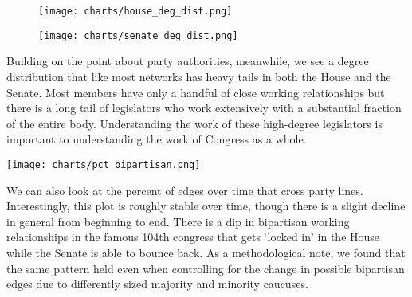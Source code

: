\begin{figure}[htbp]
  \centering
  \begin{minipage}[h]{0.4\textwidth}
    \texttt{[image: charts/house\_deg\_dist.png]}
  \end{minipage}
  \hfill
  \begin{minipage}[h]{0.4\textwidth}
    \texttt{[image: charts/senate\_deg\_dist.png]}
  \end{minipage}
\end{figure}

Building on the point about party authorities, meanwhile, we see a degree
distribution that like most networks has heavy tails in both the House and the
Senate. Most members have only a handful of close working relationships but
there is a long tail of legislators who work extensively with a substantial
fraction of the entire body. Understanding the work of these high-degree
legislators is important to understanding the work of Congress as a whole.

\texttt{[image: charts/pct\_bipartisan.png]}

We can also look at the percent of edges over time that cross party lines.
Interestingly, this plot is roughly stable over time, though there is a slight
decline in general from beginning to end. There is a dip in bipartisan working
relationships in the famous 104th congress that gets `locked in' in the House
while the Senate is able to bounce back. As a methodological note, we found that
the same pattern held even when controlling for the change in possible
bipartisan edges due to differently sized majority and minority caucuses.
